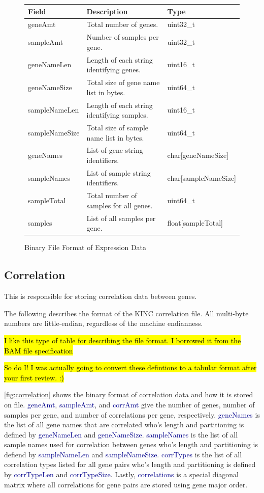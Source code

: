 \documentclass[10pt]{article}
\providecommand{\stephen}[1]{\sethlcolor{lyellow}\hl{#1}}
\providecommand{\josh}[1]{\sethlcolor{lblue}\hl{#1}}
\providecommand{\h}[1]{\textcolor{darkblue}{#1}}
\begin{document}
\begin{figure}[H]
\centering
\begin{tabularx}{\textwidth}{|l|X|l|}
\hline
\textbf{Field} & \textbf{Description} & \textbf{Type} \\
\hline
geneAmt & Total number of genes. & uint32\_t \\
\hline
sampleAmt & Number of samples per gene. & uint32\_t \\
\hline
geneNameLen & Length of each string identifying genes. & uint16\_t \\
\hline
geneNameSize & Total size of gene name list in bytes. & uint64\_t \\
\hline
sampleNameLen & Length of each string identifying samples. & uint16\_t \\
\hline
sampleNameSize & Total size of sample name list in bytes. & uint64\_t \\
\hline
geneNames & List of gene string identifiers. & char[geneNameSize] \\
\hline
sampleNames & List of sample string identifiers. & char[sampleNameSize] \\
\hline
sampleTotal & Total number of samples for all genes. & uint64\_t \\
\hline
samples & List of all samples per gene. & float[sampleTotal] \\
\hline
\end{tabularx}
\caption{Binary File Format of Expression Data}
\label{fig:expression}
\end{figure}

\subsection{Correlation}

This is responsible for storing correlation data between genes.

The following describes the format of the KINC correlation file. All 
multi-byte numbers are little-endian, regardless of the machine endianness.

\stephen{I like this type of table for describing the file format. I borrowed 
it from the BAM file specification}

\josh{So do I! I was actually going to convert these defintions to a tabular 
format after your first review. :)}

\autoref{fig:correlation} shows the binary format of correlation data and how 
it is stored on file. \h{geneAmt}, \h{sampleAmt}, and \h{corrAmt} give the 
number of genes, number of samples per gene, and number of correlations per 
gene, respectively. \h{geneNames} is the list of all gene names that are 
correlated who's length and partitioning is defined by \h{geneNameLen} and 
\h{geneNameSize}. \h{sampleNames} is the list of all sample names used for 
correlation between genes who's length and partitioning is defiend by 
\h{sampleNameLen} and \h{sampleNameSize}. \h{corrTypes} is the list of all 
correlation types listed for all gene pairs who's length and partitioning is 
defined by \h{corrTypeLen} and \h{corrTypeSize}. Lastly, \h{correlations} is a 
special diagonal matrix where all correlations for gene pairs are stored using 
gene major order.
\end{document}
